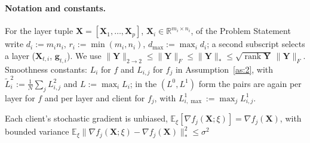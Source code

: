 %
\section{}\label{app:hyp}


\paragraph{Notation and constants.} For the layer tuple $\mathbf{X} = [\mathbf{X}_1,\dots,\mathbf{X}_p]$, $\mathbf{X}_i \in \mathbb{R}^{m_i\times n_i}$, of the Problem Statement write $d_i := m_i n_i$, $r_i := \min(m_i,n_i)$, $d_{\max} := \max_i d_i$; a second subscript selects a layer ($\mathbf{X}_{t,i}$, $\mathbf{g}_{t,i}$). We use $\|\mathbf{Y}\|_{2\to2} \le \|\mathbf{Y}\|_F \le \|\mathbf{Y}\|_{*} \le \sqrt{\operatorname{rank}\mathbf{Y}}\,\|\mathbf{Y}\|_F$. Smoothness constants: $L_i$ for $f$ and $L_{i,j}$ for $f_j$ in Assumption~\ref{as:2}, with $\tilde{L}_i^2 := \frac{1}{N}\sum_j L_{i,j}^2$ and $L := \max_i L_i$; in the $(L^0,L^1)$ form the pairs are again per layer for $f$ and per layer and client for $f_j$, with $L^1_{i,\max} := \max_j L^1_{i,j}$.

\setcounter{assumption}{2}
\begin{assumption}\label{as:3}
 Each client's stochastic gradient is unbiased, $\mathbb{E}_{\xi}[\nabla f_j(\mathbf{X};\xi)] = \nabla f_j(\mathbf{X})$, with bounded variance $\mathbb{E}_{\xi}\|\nabla f_j(\mathbf{X};\xi) - \nabla f_j(\mathbf{X})\|_*^2 \le \sigma^2$ 
\end{assumption}

